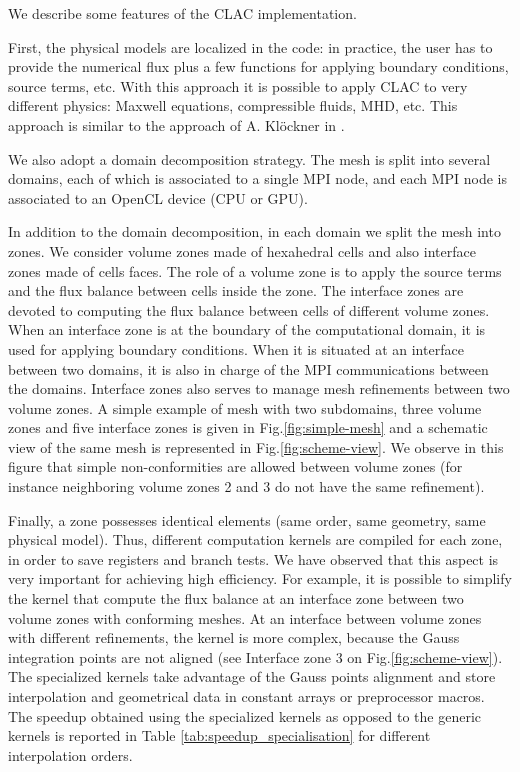 \documentclass{svmult}
\begin{document}
We describe some features of the CLAC implementation.

First, the physical models are localized in the code: in practice, the
user has to provide the numerical flux plus a few functions for
applying boundary conditions, source terms, etc. With this approach it
is possible to apply CLAC to very different physics: Maxwell
equations, compressible fluids, MHD, etc. This approach is similar to
the approach of A. Klöckner in \cite{kloeckner2010hedge}.

We also adopt a domain decomposition strategy. The mesh is split into
several domains, each of which is associated to a single MPI node, and
each MPI node is associated to an OpenCL device (CPU or GPU).

In addition to the domain decomposition, in each domain we split the
mesh into zones. We consider volume zones made of hexahedral cells and
also interface zones made of cells faces. The role of a volume zone is
to apply the source terms and the flux balance between cells inside
the zone. The interface zones are devoted to computing the flux
balance between cells of different volume zones. When an interface
zone is at the boundary of the computational domain, it is used for
applying boundary conditions. When it is situated at an interface
between two domains, it is also in charge of the MPI communications
between the domains. Interface zones also serves to manage mesh
refinements between two volume zones. A simple example of mesh with
two subdomains, three volume zones and five interface zones is given
in Fig.\ref{fig:simple-mesh} and a schematic view of the same mesh is
represented in Fig.\ref{fig:scheme-view}. We observe in this figure
that simple non-conformities are allowed between volume zones (for
instance neighboring volume zones 2 and 3 do not have the same
refinement).

Finally, a zone possesses identical elements (same order, same
geometry, same physical model). Thus, different computation kernels
are compiled for each zone, in order to save registers and branch
tests. We have observed that this aspect is very important for
achieving high efficiency. For example, it is possible to simplify the
kernel that compute the flux balance at an interface zone between
two volume zones with conforming meshes. At an interface between
volume zones with different refinements, the kernel is more complex,
because the Gauss integration points are not aligned (see Interface
zone 3 on Fig.\ref{fig:scheme-view}).  The specialized kernels take
advantage of the Gauss points alignment and store interpolation and
geometrical data in constant arrays or preprocessor macros. The
speedup obtained using the specialized kernels as opposed to the
generic kernels is reported in Table \ref{tab:speedup_specialisation}
for different interpolation orders.
\end{document}
